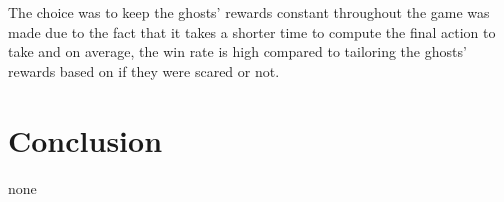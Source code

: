 \documentclass[12pt]{report}
\begin{document}
          The choice was to keep the ghosts' rewards constant throughout the game was made due to the fact that it takes a shorter time to compute the final action to take and on average, the win rate is high compared to tailoring the ghosts' rewards based on if they were scared or not.




  \section*{Conclusion}
  none
\end{document}
